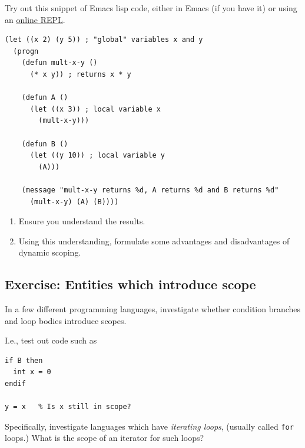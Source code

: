 \documentclass[11pt]{article}
\theoremstyle{definition}
\begin{document}
Try out this snippet of Emacs lisp code,
either in Emacs (if you have it) or using an
\href{https://repl.it/languages/elisp}{online REPL}.
\begin{verbatim}
(let ((x 2) (y 5)) ; "global" variables x and y
  (progn
    (defun mult-x-y ()
      (* x y)) ; returns x * y

    (defun A ()
      (let ((x 3)) ; local variable x
        (mult-x-y)))

    (defun B ()
      (let ((y 10)) ; local variable y
        (A)))

    (message "mult-x-y returns %d, A returns %d and B returns %d"
      (mult-x-y) (A) (B))))
\end{verbatim}

\begin{enumerate}
\item Ensure you understand the results.
\item Using this understanding, formulate some advantages and disadvantages
of dynamic scoping.
\end{enumerate}

\subsection{Exercise: Entities which introduce scope}
\label{sec:orgd21fcd2}
In a few different programming languages, investigate whether
condition branches and loop bodies introduce scopes.

I.e., test out code such as
\begin{verbatim}
if B then
  int x = 0
endif

y = x   % Is x still in scope?
\end{verbatim}

Specifically, investigate languages which have \emph{iterating loops},
(usually called \texttt{for} loops.) What is the scope of an iterator
for such loops?
\end{document}
